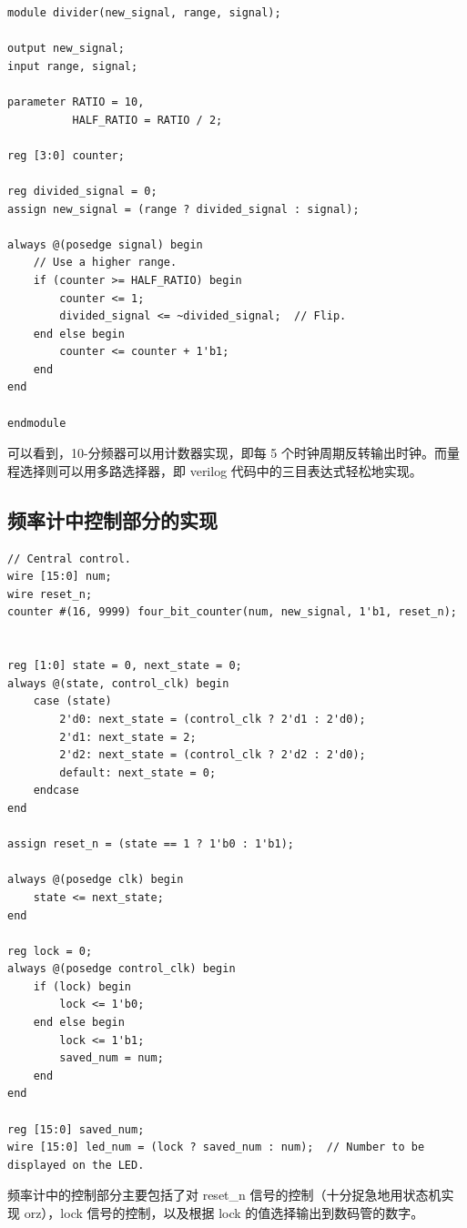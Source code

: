 \documentclass[11pt,a4paper]{article}
\begin{document}
\begin{verbatim}
module divider(new_signal, range, signal);

output new_signal;
input range, signal;

parameter RATIO = 10,
          HALF_RATIO = RATIO / 2;

reg [3:0] counter;

reg divided_signal = 0;
assign new_signal = (range ? divided_signal : signal);

always @(posedge signal) begin
    // Use a higher range.
    if (counter >= HALF_RATIO) begin
        counter <= 1;
        divided_signal <= ~divided_signal;  // Flip.
    end else begin
        counter <= counter + 1'b1;
    end
end

endmodule
\end{verbatim}

可以看到，10-分频器可以用计数器实现，即每 5 个时钟周期反转输出时钟。而量程选择则可以用多路选择器，即 verilog 代码中的三目表达式轻松地实现。

\subsection{频率计中控制部分的实现}

\begin{verbatim}
// Central control.
wire [15:0] num;
wire reset_n;
counter #(16, 9999) four_bit_counter(num, new_signal, 1'b1, reset_n);


reg [1:0] state = 0, next_state = 0;
always @(state, control_clk) begin
    case (state)
        2'd0: next_state = (control_clk ? 2'd1 : 2'd0);
        2'd1: next_state = 2;
        2'd2: next_state = (control_clk ? 2'd2 : 2'd0);
        default: next_state = 0;
    endcase
end

assign reset_n = (state == 1 ? 1'b0 : 1'b1);

always @(posedge clk) begin
    state <= next_state;
end

reg lock = 0;
always @(posedge control_clk) begin
    if (lock) begin
        lock <= 1'b0;
    end else begin
        lock <= 1'b1;
        saved_num = num;
    end
end

reg [15:0] saved_num;
wire [15:0] led_num = (lock ? saved_num : num);  // Number to be displayed on the LED.
\end{verbatim}

频率计中的控制部分主要包括了对 reset\_n 信号的控制（十分捉急地用状态机实现 orz），lock 信号的控制，以及根据 lock 的值选择输出到数码管的数字。
\end{document}
